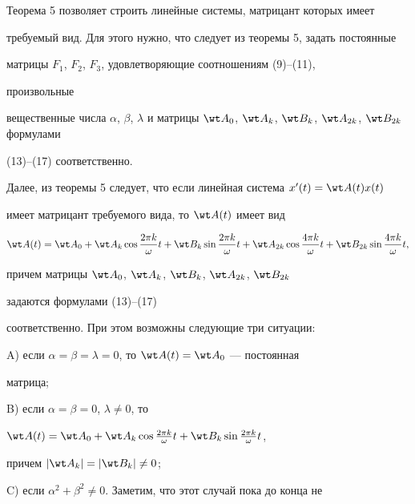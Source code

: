  


 


Теорема 5 позволяет строить линейные системы, матрицант которых имеет 


требуемый вид. Для этого нужно, что следует из теоремы 5, задать постоянные 


матрицы $F_1$, $F_2$, $F_3$, удовлетворяющие соотношениям (9)--(11), 


произвольные 


вещественные числа $\alpha$, $\beta$, $\lambda$ и матрицы $\wt A_0$, $\wt 


A_k$, $\wt B_k$, $\wt A_{2k}$, $\wt B_{2k}$ формулами 


(13)--(17) соответственно. 


 


Далее, из теоремы 5 следует, что если линейная система $x'(t)=\wt A(t)x(t)$ 


имеет матрицант требуемого вида, то $\wt A(t)$ имеет вид 


$$ 


\wt A(t)=\wt A_0+\wt A_k\cos\frac{2\pi k}{\omega}t+\wt B_k 


\sin\frac{2\pi k}{\omega}t+\wt A_{2k}\cos\frac{4\pi k}{\omega}t 


+\wt B_{2k}\sin\frac{4\pi k}{\omega}t, 


$$ 


причем матрицы $\wt A_0$, $\wt A_k$, $\wt B_k$, $\wt A_{2k}$, $\wt B_{2k}$ 


задаются формулами (13)--(17) 


соответственно. При этом возможны следующие три ситуации: 


 


A) если $\alpha=\beta=\lambda=0$, то $\wt A(t)=\wt A_0$ --- постоянная 


матрица; 


 


B) если $\alpha=\beta=0$, $\lambda\ne0$, то


$\wt A(t)=\wt A_0+\wt A_k\cos \frac{2\pi 


k}{\omega}t+\wt B_k\sin\frac{2\pi k}{\omega}t$, 


причем $|\wt A_k|=|\wt B_k|\ne0$; 


 


C) если $\alpha^2+\beta^2\ne0$. Заметим, что этот случай пока до конца не 


